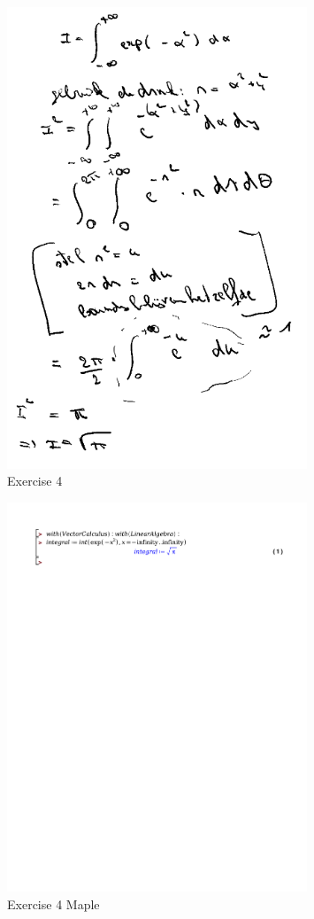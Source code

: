 \documentclass[a4paper]{article}
\begin{document}
\begin{figure}[H]
	\centering
	\includegraphics[width=0.8\textwidth]{assets/huis_5_ex_4.png}
	\caption{Exercise 4}
	\label{fig:huis_5_ex_4}
\end{figure}

\begin{figure}[H]
	\centering
	\includegraphics[width=0.8\textwidth]{exercises/huis_5_ex_4.pdf}
	\caption{Exercise 4 Maple}
	\label{fig:huis_5_ex_4_maple}
\end{figure}
\end{document}
